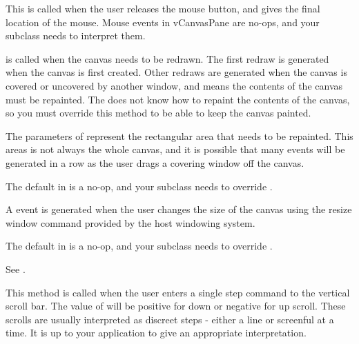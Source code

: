 
This is called when the user releases the mouse button, and
gives the final location of the mouse.
Mouse events in vCanvasPane are no-ops, and your subclass
needs to interpret them.


 is called when the canvas needs to be redrawn.
The first redraw is generated when the canvas is first created.
Other redraws are generated when the canvas is covered or uncovered
by another window, and means the contents of the canvas must
be repainted.  The  does not know how to repaint
the contents of the canvas, so you must override this method to
be able to keep the canvas painted.

The parameters of  represent the rectangular area
that needs to be repainted. This areas is not always the whole
canvas, and it is possible that many  events will
be generated in a row as the user drags a covering window off
the canvas.

The default  in  is a
no-op, and your subclass needs to override .


A  event is generated when the user changes the
size of the canvas using the resize window command provided
by the host windowing system.

The default  in  is a
no-op, and your subclass needs to override .


See .


This method is called when the user enters a single step command
to the vertical scroll bar. The value of  will be
positive for down or negative for up scroll.  These scrolls are
usually interpreted as discreet steps - either a line or
screenful at a time. It is up to your application to give an
appropriate interpretation.


